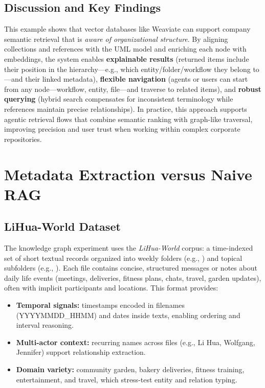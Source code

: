 \subsection{Discussion and Key Findings}
This example shows that vector databases like Weaviate can support company semantic retrieval that is \textit{aware of organizational structure}. By aligning collections and references with the UML model and enriching each node with embeddings, the system enables \textbf{explainable results} (returned items include their position in the hierarchy—e.g., which entity/folder/workflow they belong to—and their linked metadata), \textbf{flexible navigation} (agents or users can start from any node—workflow, entity, file—and traverse to related items), and \textbf{robust querying} (hybrid search compensates for inconsistent terminology while references maintain precise relationships).
In practice, this approach supports agentic retrieval flows that combine semantic ranking with graph-like traversal, improving precision and user trust when working within complex corporate repositories.


\section{Metadata Extraction versus Naive RAG}
\subsection{LiHua-World Dataset}
\label{subsec:LiHua-World}
The knowledge graph experiment uses the \emph{LiHua-World} corpus: a time-indexed set of short textual records organized into weekly folders (e.g., ) and topical subfolders (e.g., ). Each file contains concise, structured messages or notes about daily life events (meetings, deliveries, fitness plans, chats, travel, garden updates), often with implicit participants and locations. This format provides:
\begin{itemize}
    \item \textbf{Temporal signals:} timestamps encoded in filenames (YYYYMMDD\_HHMM) and dates inside texts, enabling ordering and interval reasoning.
    \item \textbf{Multi-actor context:} recurring names across files (e.g., Li Hua, Wolfgang, Jennifer) support relationship extraction.
    \item \textbf{Domain variety:} community garden, bakery deliveries, fitness training, entertainment, and travel, which stress-test entity and relation typing.
\end{itemize}

